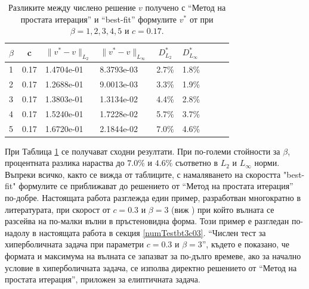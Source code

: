 \documentclass[a4paper]{article}
\theoremstyle{remark}
\begin{document}
\begin{table}[ht]
\centering
\begin{tabular}{|l|c|l l| c|l|c|l l|}
\hline 
\hline 
$\beta$	& c 	& $\|v^*-v \|_{L_2 }$ & $\|v^*-v \|_{L_\infty }$  	& $D^*_{L_2}$	& $D^*_{L_\infty }$	\\
\hline 
1& 		0.17&	1.4704e-01 		& 	8.3793e-03 				& 2.7\%			& 1.8\%		\\
\hline 
2& 		0.17&	1.2688e-01 		& 	9.0013e-03				& 3.3\%			& 1.9\%		\\
\hline 
3& 		0.17&	1.3803e-01 		& 	1.3134e-02				& 4.4\%			& 2.8\%		\\
\hline 
4& 		0.17&	 1.5240e-01 		& 	1.7228e-02				& 5.7\%			& 3.7\%		\\
\hline 
5& 		0.17&	1.6720e-01 		& 	2.1844e-02				& 7.0\%			& 4.6\%		\\
\hline 
\hline 
\end{tabular}
\caption{Разликите между числено решение $v$ получено с ``Метод на простата итерация'' и ``best-fit'' формулите $v^*$ от \cite{Ch2011} при $\beta=1, 2, 3, 4, 5$ и $c=0.17$.}
\label{tab:diff-c017}
\end{table}
При Таблица \ref{tab:diff-c017} се получават сходни резултати. При по-големи стойности за $\beta$, процентната разлика нараства до $7.0\%$ и $4.6\%$ съответно в $L_2$ и $L_\infty$ норми. Въпреки всичко, както се вижда от таблиците, с намаляването на скоростта "best-fit" формулите се приближават до решението от ``Метод на простата итерация'' по-добре. Настоящата работа разглежда един пример, разработван многократно в литературата, при скорост от $c=0.3$ и $\beta = 3$ (виж \cite{ref21, dani, milenaDani, ref22}) при който вълната се разсейва на по-малки вълни в пръстеновидна форма. Този пример е разгледан по-надолу в настоящата работа в секция \ref{numTestbt3c03}. ``Числен тест за хиперболичната задача при параметри $c=0.3$ и $\beta = 3$'', където е показано, че формата и максимума на вълната се запазват за по-дълго времеве, ако за начално условие в хиперболичната задача, се изполва директно решението от ``Метод на простата итерация'', приложен за елиптичната задача. 
\end{document}
